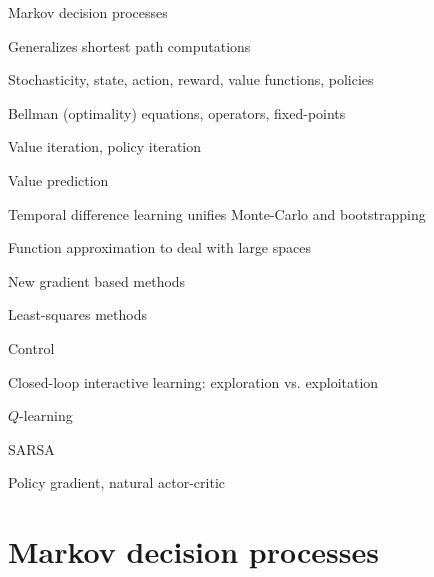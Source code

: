 {
\bi
\item Markov decision processes
\bi
\item Generalizes shortest path computations
\item Stochasticity, state, action, reward, value functions, policies
\item Bellman (optimality) equations, operators, fixed-points
\item Value iteration, policy iteration
\ei
\item Value prediction
\bi
\item Temporal difference learning unifies Monte-Carlo and bootstrapping
\item Function approximation to deal with large spaces
\item New gradient based methods %
\item Least-squares methods
\ei
\item Control
\bi
\item Closed-loop interactive learning: exploration vs. exploitation
\item $Q$-learning
\item SARSA
\item Policy gradient, natural actor-critic
\ei
\ei
{}
}



\section{Markov decision processes}


